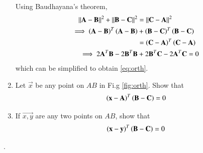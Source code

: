 \begin{enumerate}[label=\arabic*.,ref=\thesubsection.\theenumi]
\begin{figure}
\end{figure}
%
\solution Using Baudhayana's theorem,
\begin{align}
\left\lVert\mathbf{A}-\mathbf{B}\right\rVert^2 + \left\lVert\mathbf{B}-\mathbf{C}\right\rVert^2 &= 
\left\lVert\mathbf{C}-\mathbf{A}\right\rVert^2
\\
\implies 
\left(\mathbf{A}-\mathbf{B}\right)^T\left(\mathbf{A}-\mathbf{B}\right) 
&+ 
\left(\mathbf{B}-\mathbf{C}\right)^T\left(\mathbf{B}-\mathbf{C}\right) 
\nonumber \\
&= 
\left(\mathbf{C}-\mathbf{A}\right)^T \left(\mathbf{C}-\mathbf{A}\right)
\nonumber \\
\implies 
2\mathbf{A}^T\mathbf{B} - 2\mathbf{B}^T\mathbf{B}&+2\mathbf{B}^T\mathbf{C}-2\mathbf{A}^T\mathbf{C}
=0
\end{align}
which can be simplified to obtain \eqref{eq:orth}.
\item Let $\vec{x}$ be any point on $AB$ in Fi.g \ref{fig:orth}.  Show that
\begin{equation}
\left(\mathbf{x}-\mathbf{A}\right)^T\left(\mathbf{B}-\mathbf{C}\right) = 0
\end{equation}
%
\item If $\vec{x,y}$ are any two points on $AB$, show that 
\begin{equation}
\label{eq:orth_any}
\left(\mathbf{x}-\mathbf{y}\right)^T\left(\mathbf{B}-\mathbf{C}\right) = 0
\end{equation}


\end{enumerate}
.
